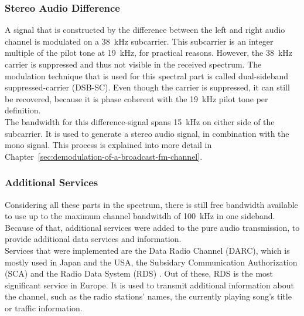 \subsubsection{Stereo Audio Difference}

A signal that is constructed by the difference between the left and right audio channel is modulated on a 38~kHz subcarrier.
This subcarrier is an integer multiple of the pilot tone at 19~kHz, for practical reasons.
However, the 38~kHz carrier is suppressed and thus not visible in the received spectrum.
The modulation technique that is used for this spectral part is called dual-sideband suppressed-carrier (DSB-SC).
Even though the carrier is suppressed, it can still be recovered, because it is phase coherent with the 19~kHz pilot tone per definition.\\

The bandwidth for this difference-signal spans 15~kHz on either side of the subcarrier.
It is used to generate a stereo audio signal, in combination with the mono signal.
This process is explained into more detail in Chapter~\ref{sec:demodulation-of-a-broadcast-fm-channel}.

\subsubsection{Additional Services}

Considering all these parts in the spectrum, there is still free bandwidth available to use up to the maximum channel bandwitdh of 100~kHz in one sideband.
Because of that, additional services were added to the pure audio transmission, to provide additional data services and information.\\

Services that were implemented are the Data Radio Channel (DARC), which is mostly used in Japan and the USA, the Subsidary Communication Authorization (SCA) and the Radio Data System (RDS) \cite{RohdeSchwarzFM}.
Out of these, RDS is the most significant service in Europe.
It is used to transmit additional information about the channel, such as the radio stations' names, the currently playing song's title or traffic information.



